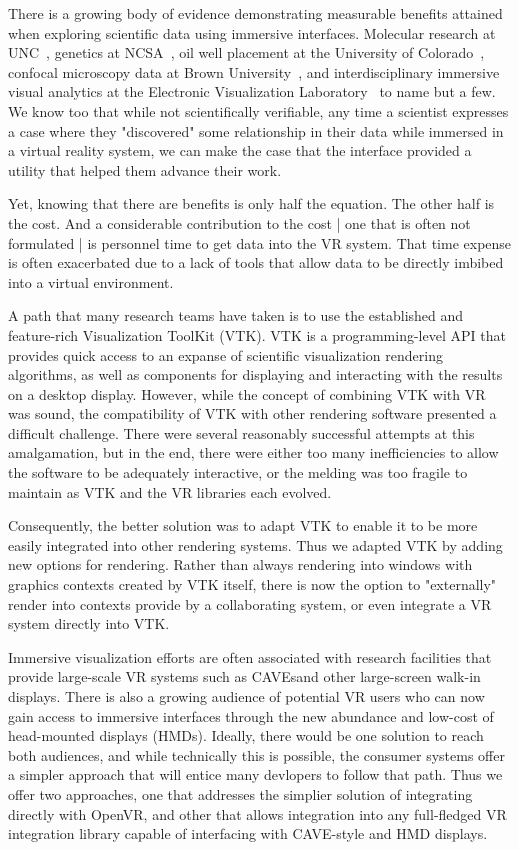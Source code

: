 
There is a growing body of evidence demonstrating measurable benefits
attained when exploring scientific data using immersive interfaces.
Molecular research at UNC~\cite{Brooks:1990},
genetics at NCSA~\cite{Brady:1995},
oil well placement at the University of Colorado~\cite{Gruchalla:2004},  confocal microscopy data at Brown University~\cite{Prabhat:2008}, and interdisciplinary immersive visual analytics at the Electronic Visualization Laboratory~\cite{Marai:2016} to name but a few.
We know too that while not scientifically verifiable, any time a scientist
expresses a case where they "discovered" some relationship in their data
while immersed in a virtual reality system, we can make the case that the
interface provided a utility that helped them advance their work.

Yet, knowing that there are benefits is only half the equation.
The other half is the cost.
And a considerable contribution to the cost | one that is often not
formulated | is personnel time to get data into the VR system.
That time expense is often exacerbated due to a lack of tools that
allow data to be directly imbibed into a virtual environment.

A path that many research teams have taken is to use the established and
feature-rich Visualization ToolKit (VTK).
VTK is a programming-level API that provides quick access to an expanse
of scientific visualization rendering algorithms, as well as components
for displaying and interacting with the results on a desktop display.
However, while the concept of combining VTK with VR was sound, the
compatibility of VTK with other rendering software presented a difficult
challenge.  
There were several reasonably successful attempts at this amalgamation,
but in the end, there were either too many inefficiencies to allow the
software to be adequately interactive, or the melding was too fragile to
maintain as VTK and the VR libraries each evolved.

Consequently, the better solution was to adapt VTK to enable it to be
more easily integrated into other rendering systems.
Thus we adapted VTK by adding new options for rendering.
Rather than always rendering into windows with graphics contexts
created by VTK itself, there is now the option to "externally" render
into contexts provide by a collaborating system, or even integrate a
VR system directly into VTK.


Immersive visualization efforts are often associated with research
facilities that provide large-scale VR systems such as CAVEs\texttrademark and
other large-screen walk-in displays.
There is also a growing audience of potential VR users who can now
gain access to immersive interfaces through the new abundance and low-cost
of head-mounted displays (HMDs).
Ideally, there would be one solution to reach both audiences, and while
technically this is possible, the consumer systems offer a simpler
approach that will entice many devlopers to follow that path.
Thus we offer two approaches, one that addresses the simplier solution
of integrating directly with OpenVR, and other that allows integration
into any full-fledged VR integration library capable of interfacing
with CAVE-style and HMD displays.


